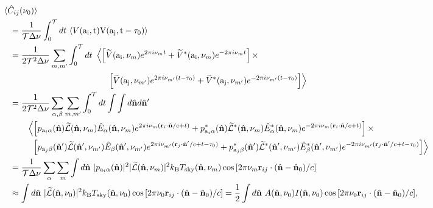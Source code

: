\documentclass[11pt]{article}
\numberwithin{equation}{section}
\newcommand{\bt}[1]{\mathbf{#1}}
\newcommand{\wt}[1]{\widetilde{#1}}
\newcommand{\kb}{k_{\rm B}}
\begin{document}
\begin{align}
~~~ & \!\!\!\!
  \langle \hat{C}_{ij}(\nu_0) \rangle \nonumber \\
  & = \frac{1}{{\cal T} \Delta\nu} \int_0^{\cal T} dt \ \langle V(\rm a_i, t) V(\rm a_j, t - \tau_0) \rangle \notag \\
%  
  & = \frac{1}{2 {\cal T}^2 \Delta\nu} \sum_{m, m^\prime} \int_0^{\cal T} dt \ \left\langle \left[ \wt{V}({\rm a_i}, \nu_m) e^{2\pi i \nu_m t} + \wt{V}^\ast({\rm a_i}, \nu_m) e^{-2\pi i \nu_m t} \right] \times \right. \notag \\ 
  & \hspace{114pt} \left. \left[ \wt{V}({\rm a_j}, \nu_{m^\prime}) e^{2\pi i \nu_{m^\prime} (t - \tau_0)} + \wt{V}^\ast({\rm a_j}, \nu_{m^\prime}) e^{-2\pi i \nu_{m^\prime} (t - \tau_0)} \right] \right\rangle \notag \\
%  
  & = \frac{1}{2 {\cal T}^2 \Delta\nu} \sum_{\alpha, \beta} \sum_{m, m^\prime} \int_0^{\cal T} dt \int \int d\hat{\bt n} d\hat{\bt n}^\prime \notag \\
  & \hspace{20pt} \left\langle \left[ p_{{\rm a}_i \alpha}(\hat{\bt n})  \wt{\mathcal{L}}(\hat{\bt n}, \nu_{m}) \hat{E}_\alpha(\hat{\bt n}, \nu_{m}) e^{2\pi i \nu_{m} (\bt r_i \cdot \hat{\bt n}/c + t)} + p_{{\rm a}_i \alpha}^\ast(\hat{\bt n}) \wt{\mathcal{L}}^\ast(\hat{\bt n}, \nu_{m}) \hat{E}^\ast_\alpha(\hat{\bt n}, \nu_{m}) e^{-2\pi i \nu_{m} (\bt r_i \cdot \hat{\bt n}/c + t)} \right] \times \right. \notag \\ 
  & \hspace{25pt} \left. \left[ p_{{\rm a}_j \beta}(\hat{\bt n}^\prime) \wt{\mathcal{L}}(\hat{\bt n}^\prime, \nu_{m^\prime}) \hat{E}_\beta(\hat{\bt n}^\prime, \nu_{m^\prime}) e^{2\pi i \nu_{m^\prime} (\bt r_j \cdot \hat{\bt n}^\prime/c + t - \tau_0)} + p_{{\rm a}_j \beta}^\ast(\hat{\bt n}^\prime) \wt{\mathcal{L}}^\ast(\hat{\bt n}^\prime, \nu_{m^\prime}) \hat{E}^\ast_\beta(\hat{\bt n}^\prime, \nu_{m^\prime})  e^{-2\pi i \nu_{m^\prime} (\bt r_j \cdot \hat{\bt n}^\prime/c + t - \tau_0)} \right] \right\rangle  \notag \\
%  
  & = \frac{1}{{\cal T} \Delta\nu} \sum_{\alpha} \sum_{m} \int d\hat{\bt n} \ \vert p_{{\rm a}_i \alpha}(\hat{\bt n}) \vert^2 \vert \wt{\mathcal{L}}(\hat{\bt n}, \nu_{m}) \vert^2 \kb T_{\rm sky}(\hat{\bt n}, \nu_m)  \cos{\left[ 2\pi \nu_{m} \bt r_{ij} \cdot (\hat{\bt n} - \hat{\bt n}_0)/c \right]} \notag \\
%  
  & \approx \int d\hat{\bt n} \ \vert \wt{\mathcal{L}}(\hat{\bt n}, \nu_{0}) \vert^2 \kb T_{\rm sky}(\hat{\bt n}, \nu_0) \cos{\left[ 2\pi \nu_{0} \bt r_{ij} \cdot (\hat{\bt n} - \hat{\bt n}_0)/c \right]} = \frac12 \int d\hat{\bt n} \ A(\hat{\bt n}, \nu_0) I(\hat{\bt n}, \nu_0)  \cos{\left[ 2\pi \nu_{0} \bt r_{ij} \cdot (\hat{\bt n} - \hat{\bt n}_0)/c \right]} \mbox{,} \label{eq:visibilitydef}
\end{align}
\end{document}

